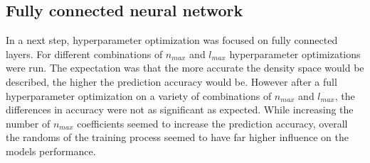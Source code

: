 \subsection{Fully connected neural network}

In a next step, hyperparameter optimization was focused on fully connected layers.
For different combinations of $n_{max}$ and $l_{max}$ hyperparameter optimizations were run.
The expectation was that the more accurate the density space would be described, the higher the prediction accuracy would be.
However after a full hyperparameter optimization on a variety of combinations of $n_{max}$ and $l_{max}$,
the differences in accuracy were not as significant as expected.
While increasing the number of $n_{max}$ coefficients seemed to increase the prediction accuracy,
overall the randoms of the training process seemed to have far higher influence on the models performance.


